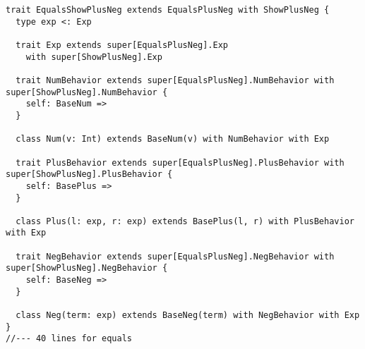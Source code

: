 \begin{lstlisting}
trait EqualsShowPlusNeg extends EqualsPlusNeg with ShowPlusNeg {
  type exp <: Exp

  trait Exp extends super[EqualsPlusNeg].Exp
    with super[ShowPlusNeg].Exp

  trait NumBehavior extends super[EqualsPlusNeg].NumBehavior with super[ShowPlusNeg].NumBehavior {
    self: BaseNum =>
  }

  class Num(v: Int) extends BaseNum(v) with NumBehavior with Exp

  trait PlusBehavior extends super[EqualsPlusNeg].PlusBehavior with super[ShowPlusNeg].PlusBehavior {
    self: BasePlus =>
  }

  class Plus(l: exp, r: exp) extends BasePlus(l, r) with PlusBehavior with Exp

  trait NegBehavior extends super[EqualsPlusNeg].NegBehavior with super[ShowPlusNeg].NegBehavior {
    self: BaseNeg =>
  }

  class Neg(term: exp) extends BaseNeg(term) with NegBehavior with Exp
}
//--- 40 lines for equals
\end{lstlisting}

